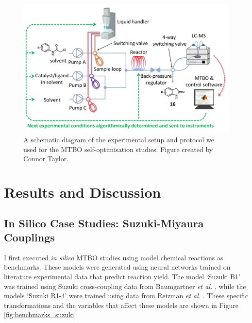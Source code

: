 \begin{figure}
    \centering
    \includegraphics{gfx/Chapter04/self_optimization_setup.png}
    \caption{A schematic diagram of the experimental setup and protocol we used for the MTBO self-optimisation studies. Figure created by Connor Taylor.}
    \label{fig:self_opt_setup}
\end{figure}

\section{Results and Discussion}


\subsection{In Silico Case Studies: Suzuki-Miyaura Couplings}

I first executed \textit{in silico} MTBO studies using model chemical reactions as benchmarks. These models were generated using neural networks trained on literature experimental data that predict reaction yield. The model `Suzuki B1' was trained using Suzuki cross-coupling data from Baumgartner \textit{et al.} \cite{Baumgartner2018}, while the models `Suzuki R1-4' were trained using data from Reizman \textit{et al.} \cite{Reizman2016a}.  These specific transformations and the variables that affect these models are shown in Figure \ref{fig:benchmarks_suzuki}.

